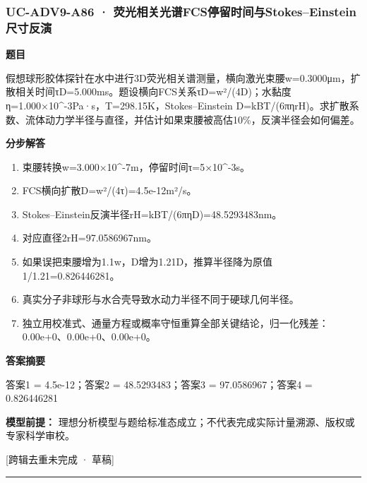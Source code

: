\documentclass[UTF8,11pt,a4paper]{ctexart}
\begin{document}
\subsubsection*{UC-ADV9-A86 · 荧光相关光谱FCS停留时间与Stokes–Einstein尺寸反演}
\noindent\textbf{题目}\par
假想球形胶体探针在水中进行3D荧光相关谱测量，横向激光束腰w=0.3000μm，扩散相关时间τD=5.000ms。题设横向FCS关系τD=w²/(4D)；水黏度η=1.000×10\textasciicircum{}-3Pa·s，T=298.15K，Stokes–Einstein D=kBT/(6πηrH)。求扩散系数、流体动力学半径与直径，并估计如果束腰被高估10\%，反演半径会如何偏差。\par
\medskip\noindent\textbf{分步解答}
\begin{enumerate}
\item 束腰转换w=3.000×10\textasciicircum{}-7m，停留时间τ=5×10\textasciicircum{}-3s。
\item FCS横向扩散D=w²/(4τ)=4.5e-12m²/s。
\item Stokes–Einstein反演半径rH=kBT/(6πηD)=48.5293483nm。
\item 对应直径2rH=97.0586967nm。
\item 如果误把束腰增为1.1w，D增为1.21D，推算半径降为原值1/1.21=0.826446281。
\item 真实分子非球形与水合壳导致水动力半径不同于硬球几何半径。
\item 独立用校准式、通量方程或概率守恒重算全部关键结论，归一化残差：0.00e+0、0.00e+0、0.00e+0。
\end{enumerate}
\noindent\textbf{答案摘要}\par
答案1 = 4.5e-12；答案2 = 48.5293483；答案3 = 97.0586967；答案4 = 0.826446281\par
\noindent\textbf{模型前提：}
理想分析模型与题给标准态成立；不代表完成实际计量溯源、版权或专家科学审校。\par
\noindent\textcolor{red!65!black}{[跨辑去重未完成 · 草稿]} \par
\medskip\hrule\medskip
{}
\end{document}
